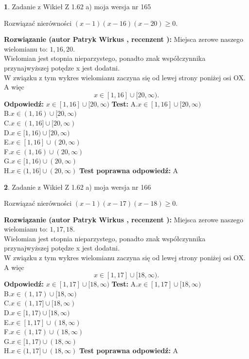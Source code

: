 \documentclass[12pt, a4paper]{article}
\theoremstyle{definition} %
\newtheorem{zad}{}
\newcommand{\zadStart}[1]{\begin{zad}#1\newline}
\newcommand{\zadStop}{\end{zad}}
\newcommand{\rozwStart}[2]{\noindent \textbf{Rozwiązanie (autor #1 , recenzent #2): }\newline}
\newcommand{\rozwStop}{\newline}
\newcommand{\odpStart}{\noindent \textbf{Odpowiedź:}\newline}
\newcommand{\odpStop}{\newline}
\newcommand{\testStart}{\noindent \textbf{Test:}\newline}
\newcommand{\testStop}{\newline}
\newcommand{\kluczStart}{\noindent \textbf{Test poprawna odpowiedź:}\newline}
\newcommand{\kluczStop}{\newline}
\begin{document}
\zadStart{Zadanie z Wikieł Z 1.62 a) moja wersja nr 165}

Rozwiązać nierówności $(x-1)(x-16)(x-20)\ge0$.
\zadStop
\rozwStart{Patryk Wirkus}{}
Miejsca zerowe naszego wielomianu to: $1, 16, 20$.\\
Wielomian jest stopnia nieparzystego, ponadto znak współczynnika przy\linebreak najwyższej potędze x jest dodatni.\\ W związku z tym wykres wielomianu zaczyna się od lewej strony poniżej osi OX. A więc $$x \in [1,16] \cup [20,\infty).$$
\rozwStop
\odpStart
$x \in [1,16] \cup [20,\infty)$
\odpStop
\testStart
A.$x \in [1,16] \cup [20,\infty)$\\
B.$x \in (1,16) \cup [20,\infty)$\\
C.$x \in (1,16] \cup [20,\infty)$\\
D.$x \in [1,16) \cup [20,\infty)$\\
E.$x \in [1,16] \cup (20,\infty)$\\
F.$x \in (1,16) \cup (20,\infty)$\\
G.$x \in [1,16) \cup (20,\infty)$\\
H.$x \in (1,16] \cup (20,\infty)$
\testStop
\kluczStart
A
\kluczStop



\zadStart{Zadanie z Wikieł Z 1.62 a) moja wersja nr 166}

Rozwiązać nierówności $(x-1)(x-17)(x-18)\ge0$.
\zadStop
\rozwStart{Patryk Wirkus}{}
Miejsca zerowe naszego wielomianu to: $1, 17, 18$.\\
Wielomian jest stopnia nieparzystego, ponadto znak współczynnika przy\linebreak najwyższej potędze x jest dodatni.\\ W związku z tym wykres wielomianu zaczyna się od lewej strony poniżej osi OX. A więc $$x \in [1,17] \cup [18,\infty).$$
\rozwStop
\odpStart
$x \in [1,17] \cup [18,\infty)$
\odpStop
\testStart
A.$x \in [1,17] \cup [18,\infty)$\\
B.$x \in (1,17) \cup [18,\infty)$\\
C.$x \in (1,17] \cup [18,\infty)$\\
D.$x \in [1,17) \cup [18,\infty)$\\
E.$x \in [1,17] \cup (18,\infty)$\\
F.$x \in (1,17) \cup (18,\infty)$\\
G.$x \in [1,17) \cup (18,\infty)$\\
H.$x \in (1,17] \cup (18,\infty)$
\testStop
\kluczStart
A
\kluczStop
\end{document}
